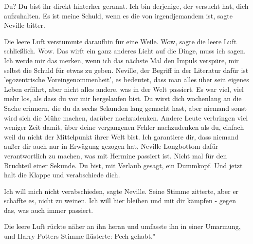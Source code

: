 \glqq{}Du? Du bist ihr direkt hinterher gerannt. Ich bin derjenige, der versucht
hat, dich aufzuhalten. Es ist meine Schuld, wenn es die von irgendjemandem
ist\grqq{}, sagte Neville bitter.

Die leere Luft verstummte daraufhin für eine Weile. \glqq{}Wow\grqq{}, sagte die
leere Luft schließlich. \glqq{}Wow. Das wirft ein ganz anderes Licht auf die
Dinge, muss ich sagen. Ich werde mir das merken, wenn ich das nächste Mal den
Impuls verspüre, mir selbst die Schuld für etwas zu geben. Neville, der Begriff
in der Literatur dafür ist 'egozentrische Voreingenommenheit', es bedeutet, dass
man alles über sein eigenes Leben erfährt, aber nicht alles andere, was in der
Welt passiert. Es war viel, viel mehr los, als dass du vor mir hergelaufen bist.
Du wirst dich wochenlang an die Sache erinnern, die du da sechs Sekunden lang
gemacht hast, aber niemand sonst wird sich die Mühe machen, darüber
nachzudenken. Andere Leute verbringen viel weniger Zeit damit, über deine
vergangenen Fehler nachzudenken als du, einfach weil du nicht der Mittelpunkt
ihrer Welt bist. Ich garantiere dir, dass niemand außer dir auch nur in Erwägung
gezogen hat, Neville Longbottom dafür verantwortlich zu machen, was mit Hermine
passiert ist. Nicht mal für den Bruchteil einer Sekunde. Du bist, mit Verlaub
gesagt, ein Dummkopf. Und jetzt halt die Klappe und verabschiede dich.\grqq{}

\glqq{}Ich will mich nicht verabschieden\grqq{}, sagte Neville. Seine Stimme
zitterte, aber er schaffte es, nicht zu weinen. \glqq{}Ich will hier bleiben und
mit dir kämpfen - gegen das, was auch immer passiert.\grqq{}

Die leere Luft rückte näher an ihn heran und umfasste ihn in einer Umarmung, und
Harry Potters Stimme flüsterte: \glqq{}Pech gehabt."

